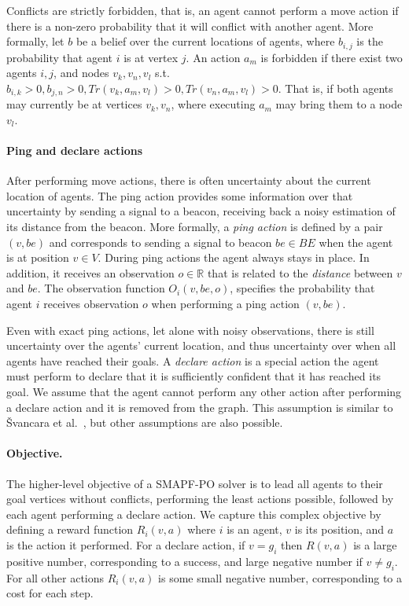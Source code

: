 \documentclass[letterpaper]{article} %
\newcommand{\shortcite}[1]{{\cite{#1}}}
\begin{document}
Conflicts are strictly forbidden, that is, an agent cannot perform a move action if there is a non-zero probability that it will conflict with another agent.  More formally, let $b$ be a belief over the current locations of agents, where $b_{i,j}$ is the probability that agent $i$ is at vertex $j$.
An action $a_m$ is forbidden if there exist two agents $i,j$, and nodes $v_{k},v_{n},v_{l}$ s.t.
$b_{i,k}>0, b_{j,n}>0, Tr(v_k,a_m,v_l)>0, Tr(v_n,a_m,v_l)>0 $. That is, if both agents may currently be at vertices $v_k,v_n$, where executing $a_m$ may bring them to a node $v_l$.



\paragraph{Ping and declare actions} After performing move actions, there is often uncertainty about the current location of agents. The ping action provides some information over that uncertainty by sending a signal to a beacon, receiving back a noisy estimation of its distance from the beacon. 
More formally, a \emph{ping action} is defined by a pair $(v,be)$ and corresponds to sending a signal to beacon $be\in BE$ when the agent is at position $v\in V$. During ping actions the agent always stays in place. 
In addition, it receives an observation $o\in\mathbb{R}$ that is related to the \emph{distance} between $v$ and $be$. The  observation function $O_i(v,be,o)$, specifies the probability that agent $i$ receives observation $o$ when performing a ping action $(v,be)$. 

Even with exact ping actions, let alone with noisy observations, there is still uncertainty over the agents' current location, and thus uncertainty over when all agents have reached their goals. 
A \emph{declare action} is a special action the agent must perform to declare that it is sufficiently confident that it has reached its goal. We assume that the agent cannot perform any other action after performing a declare action and it is removed from the graph. This assumption is similar to  {\v{S}}vancara et al.~\shortcite{vsvancara2019online}, but other assumptions are also possible. 

\paragraph{Objective.} The higher-level objective of a SMAPF-PO solver is to lead all agents to their goal vertices without conflicts, performing the least actions possible, followed by each agent performing a declare action.  
We capture this complex objective by defining a reward function $R_i(v,a)$ where $i$ is an agent, $v$ is its position, and $a$ is the action it performed. 
For a declare action, if $v=g_i$ then $R(v,a)$ is a large positive number, corresponding to a success, and large negative number if $v \neq g_i$.  For all other actions $R_i(v,a)$ is some small negative number, corresponding to a cost for each step. 
\end{document}
